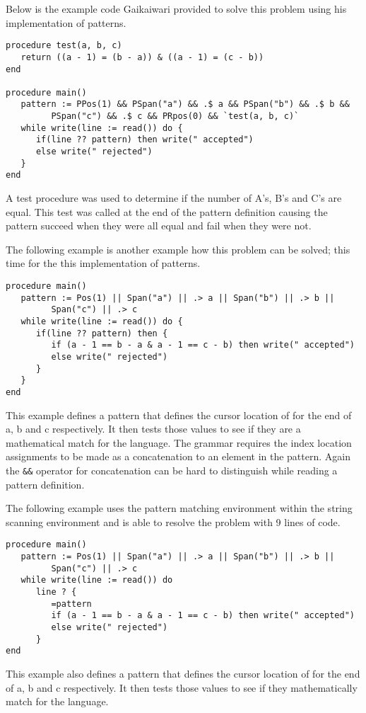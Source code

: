 \documentclass{article}
\begin{document}
Below is the example code Gaikaiwari provided to solve this problem using his implementation of patterns.  
\begin{verbatim}
procedure test(a, b, c)
   return ((a - 1) = (b - a)) & ((a - 1) = (c - b))
end

procedure main()
   pattern := PPos(1) && PSpan("a") && .$ a && PSpan("b") && .$ b && 
         PSpan("c") && .$ c && PRpos(0) && `test(a, b, c)`
   while write(line := read()) do {
      if(line ?? pattern) then write(" accepted")
      else write(" rejected")
   }
end
\end{verbatim}
A test procedure was used to determine if the number of A's, B's and C's are equal.  This test was called at the end of the pattern definition causing the pattern succeed when they were all equal and fail when they were not.

The following example is another example how this problem can be solved; this time for the this implementation of patterns.
\begin{verbatim}
procedure main()
   pattern := Pos(1) || Span("a") || .> a || Span("b") || .> b || 
         Span("c") || .> c
   while write(line := read()) do {
      if(line ?? pattern) then {
         if (a - 1 == b - a & a - 1 == c - b) then write(" accepted")
         else write(" rejected")
      }
   }
end
\end{verbatim}
This example defines a pattern that defines the cursor location of for the end of a, b and c respectively.  It then tests those values to see if they are a mathematical match for the language.  The grammar requires the index location assignments to be made as a concatenation to an element in the pattern.  Again the \texttt{\&\&} operator for concatenation can be hard to distinguish while reading a pattern definition.

The following example uses the pattern matching environment within the string scanning environment and is able to resolve the problem with 9 lines of code.
\begin{verbatim}
procedure main()
   pattern := Pos(1) || Span("a") || .> a || Span("b") || .> b ||
         Span("c") || .> c 
   while write(line := read()) do
      line ? {
         =pattern
         if (a - 1 == b - a & a - 1 == c - b) then write(" accepted")
         else write(" rejected")
      }
end
\end{verbatim}
This example also defines a pattern that defines the cursor location of for the end of a, b and c respectively.  It then tests those values to see if they mathematically match for the language.
\end{document}
